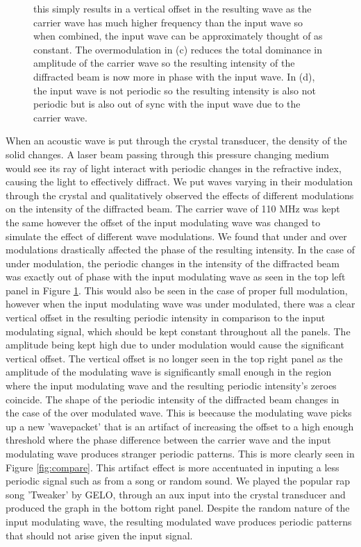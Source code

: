 \documentclass[aps,prl,reprint,10pt,amsmath,amssymb,superscriptaddress,a4paper]{revtex4-2}
\begin{document}
\begin{figure}
{    this simply results in a vertical offset in the resulting wave as the carrier wave has much higher frequency than the input wave 
    so when combined, the input wave can be approximately thought of as constant. The overmodulation in (c) reduces the total dominance 
    in amplitude of the carrier wave so the resulting intensity of the diffracted beam is now more in phase with the input wave. In (d), 
    the input wave is not periodic so the resulting intensity is also not periodic but is also out of sync with the input wave due to the 
    carrier wave.}
    \label{fig:main}
\end{figure}

When an acoustic wave is put through the crystal transducer, the density of the solid changes. A laser beam passing through this pressure changing medium would see its ray of light 
interact with periodic changes in the refractive index, causing the light to effectively diffract. We put waves varying in their modulation through the crystal and qualitatively 
observed the effects of different modulations on the intensity of the diffracted beam. The carrier wave of 110 MHz was kept the same however the offset of the input modulating wave 
was changed to simulate the effect of different wave modulations. We found that under and over modulations drastically affected the phase of the resulting intensity. In the case of 
under modulation, the periodic changes in the intensity of the diffracted beam was exactly out of phase with the input modulating wave as seen in the top left panel in Figure \ref{fig:main}.
This would also be seen in the case of proper full modulation, however when the input modulating wave was under modulated, there was a clear vertical offset in the resulting periodic intensity 
in comparison to the input modulating signal, which should be kept constant throughout all the panels. The amplitude being kept high due to under modulation would cause the significant 
vertical offset. The vertical offset is no longer seen in the top right panel as the amplitude of the modulating wave is significantly small enough in the region where the input modulating 
wave and the resulting periodic intensity's zeroes coincide. The shape of the periodic intensity of the diffracted beam changes in the case of the over modulated wave. This is beecause 
the modulating wave picks up a new 'wavepacket' that is an artifact of increasing the offset to a high enough threshold where the phase difference between the carrier wave and the input 
modulating wave produces stranger periodic patterns. This is more clearly seen in Figure \ref{fig:compare}. This artifact effect is more accentuated in inputing a less periodic signal such as from a song or random sound. We played the popular rap 
song 'Tweaker' by GELO, through an aux input into the crystal transducer and produced the graph in the bottom right panel. Despite the random nature of the input modulating wave, the resulting 
modulated wave produces periodic patterns that should not arise given the input signal. 
\end{document}
